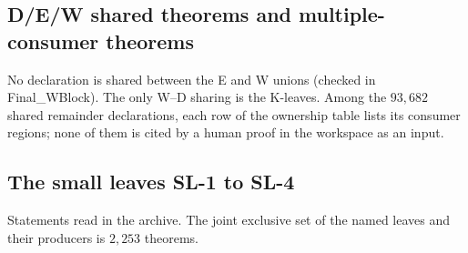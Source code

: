\documentclass[10pt]{article}
\newcommand{\SL}[1]{\textsf{SL-#1}}
\begin{document}
\subsection{D/E/W shared theorems and multiple-consumer theorems}
No declaration is shared between the E and W unions (checked in Final\_WBlock). The only W--D sharing is the K-leaves. Among the $93{,}682$ shared remainder declarations, each row of the ownership table lists its consumer regions; none of them is cited by a human proof in the workspace as an input.

\subsection{The small leaves \SL{1} to \SL{4}}\label{sec:sl}
Statements read in the archive. The joint exclusive set of the named leaves and their producers is $2{,}253$ theorems.
\end{document}
